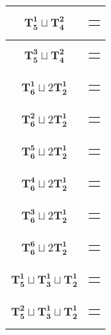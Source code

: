 \documentclass{article}
\begin{document}
{\begin{longtable}{|c|c|}
    $\mathbf{T_{5}^{1}} \sqcup \mathbf{T_{4}^{2}}$ & \begin{tabular}{@{}l@{}} $(4,8,1,7,2)\sqcup(10,9,11,12)$ \end{tabular} \\ \hline
    $\mathbf{T_{5}^{3}} \sqcup \mathbf{T_{4}^{2}}$ & \begin{tabular}{@{}l@{}} $(6,0,3,4,5)\sqcup(8,9,2,7)$ \end{tabular} \\ \hline
    $\mathbf{T_{6}^{1}} \sqcup 2\mathbf{T_{2}^{1}}$ & \begin{tabular}{@{}l@{}} $(0,6,1,5,2,9)\sqcup(8,10)\sqcup(3,4)$ \end{tabular} \\ \hline
    $\mathbf{T_{6}^{2}} \sqcup 2\mathbf{T_{2}^{1}}$ & \begin{tabular}{@{}l@{}} $(3,6,1,8,4,0)\sqcup(5,7)\sqcup(9,10)$ \end{tabular} \\ \hline
    $\mathbf{T_{6}^{5}} \sqcup 2\mathbf{T_{2}^{1}}$ & \begin{tabular}{@{}l@{}} $(4,1,8,3,5,7)\sqcup(0,2)\sqcup(9,10)$ \end{tabular} \\ \hline
    $\mathbf{T_{6}^{4}} \sqcup 2\mathbf{T_{2}^{1}}$ & \begin{tabular}{@{}l@{}} $(5,8,4,1,6,7)\sqcup(0,2)\sqcup(9,10)$ \end{tabular} \\ \hline
    $\mathbf{T_{6}^{3}} \sqcup 2\mathbf{T_{2}^{1}}$ & \begin{tabular}{@{}l@{}} $(5,11,9,12,7,10)\sqcup(8,1)\sqcup(0,4)$ \end{tabular} \\ \hline
    $\mathbf{T_{6}^{6}} \sqcup 2\mathbf{T_{2}^{1}}$ & \begin{tabular}{@{}l@{}} $(4,1,8,5,6,7)\sqcup(2,3)\sqcup(9,11)$ \end{tabular} \\ \hline
    $\mathbf{T_{5}^{1}} \sqcup \mathbf{T_{3}^{1}} \sqcup \mathbf{T_{2}^{1}}$ & \begin{tabular}{@{}l@{}} $(0,6,1,5,2)\sqcup(8,10,9)\sqcup(11,4)$ \end{tabular} \\ \hline
    $\mathbf{T_{5}^{2}} \sqcup \mathbf{T_{3}^{1}} \sqcup \mathbf{T_{2}^{1}}$ & \begin{tabular}{@{}l@{}} $(7,1,8,5,6)\sqcup(10,9,11)\sqcup(0,4)$ \end{tabular} \\ \hline

\end{longtable}}
\end{document}

